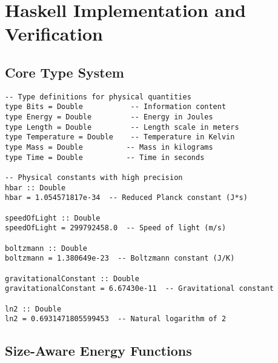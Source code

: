 \documentclass[11pt,a4paper]{article}
\theoremstyle{definition}
\begin{document}
\section{Haskell Implementation and Verification}

\subsection{Core Type System}

\begin{lstlisting}
-- Type definitions for physical quantities
type Bits = Double           -- Information content
type Energy = Double         -- Energy in Joules
type Length = Double         -- Length scale in meters
type Temperature = Double    -- Temperature in Kelvin
type Mass = Double          -- Mass in kilograms
type Time = Double          -- Time in seconds

-- Physical constants with high precision
hbar :: Double
hbar = 1.054571817e-34  -- Reduced Planck constant (J*s)

speedOfLight :: Double
speedOfLight = 299792458.0  -- Speed of light (m/s)

boltzmann :: Double
boltzmann = 1.380649e-23  -- Boltzmann constant (J/K)

gravitationalConstant :: Double
gravitationalConstant = 6.67430e-11  -- Gravitational constant

ln2 :: Double
ln2 = 0.6931471805599453  -- Natural logarithm of 2
\end{lstlisting}

\subsection{Size-Aware Energy Functions}
\end{document}
